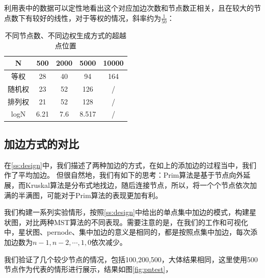 \documentclass[UTF8]{ctexart}
\begin{document}
利用表中的数据可以定性地看出这个对应加边次数和节点数正相关，且在较大的节点数下有较好的线性，对于等权的情况，斜率约为\(\frac{1}{50}\)：

\begin{table}[htbp]
    \centering
    \begin{tabular}{|c|c|c|c|c|}
    \hline
    N    & 500  & 2000 & 5000  & 10000 \\ \hline
    等权   & 28   & 40   & 94    & 164   \\ \hline
    随机权  & 23   & 52   & 126   & /     \\ \hline
    排列权  & 21   & 52   & 128   & /     \\ \hline
    logN & 6.21 & 7.6  & 8.517 & /     \\ \hline
    \end{tabular}
    \caption{不同节点数、不同边权生成方式的超越点位置}
    \label{tab:suppoint}
\end{table}

\subsection{加边方式的对比}
在\ref{ss:design}中，我们描述了两种加边的方式，在如上的添加边的过程当中，我们作了平均加边。 但很自然地，我们有如下的思考：Prim算法是基于节点向外延展，而Kruskal算法是分布式地找边，随后连接节点，所以，将一个个节点依次加满的半满图，可能对于Prim算法的表现更加有利。

我们构建一系列实验情形，按照\ref{ss:design}中给出的单点集中加边的模式，构建星状图，对比两种MST算法的不同表现。需要注意的是，在我们的工作和可视化中，星状图、pernode、集中加边的意义是相同的，都是按照点集中加边，每次添加边数为\(n-1,n-2,\cdots,1,0\)依次减少。

我们验证了几个较少节点的情况，包括100,200,500，大体结果相同，这里使用500节点作为代表的情形进行展示，结果如图\ref{fig:pntest}， 
\end{document}
